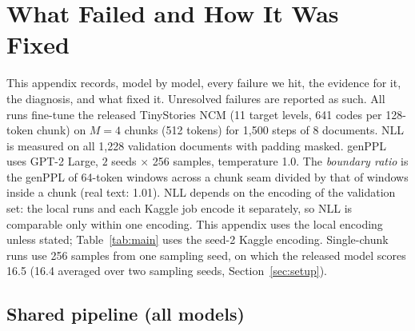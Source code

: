 \section{What Failed and How It Was Fixed}
\label{sec:failures}

This appendix records, model by model, every failure we hit, the evidence for it, the diagnosis, and what
fixed it. Unresolved failures are reported as such. All runs fine-tune the released TinyStories NCM
(11 target levels, 641 codes per 128-token chunk) on $M{=}4$ chunks (512 tokens) for 1{,}500
steps of 8 documents. NLL is measured on all 1{,}228 validation documents with padding masked. genPPL uses
GPT-2 Large, $2$ seeds $\times$ 256 samples, temperature 1.0. The \emph{boundary ratio} is the genPPL of 64-token
windows across a chunk seam divided by that of windows inside a chunk (real text: 1.01). NLL depends on the encoding
of the validation set: the local runs and each Kaggle job encode it separately, so NLL is comparable only within one
encoding. This appendix uses the local encoding unless stated; Table~\ref{tab:main} uses the seed-2 Kaggle
encoding. Single-chunk runs use 256 samples from one sampling seed, on which the released model scores 16.5 (16.4
averaged over two sampling seeds, Section~\ref{sec:setup}).

\subsection{Shared pipeline (all models)}

